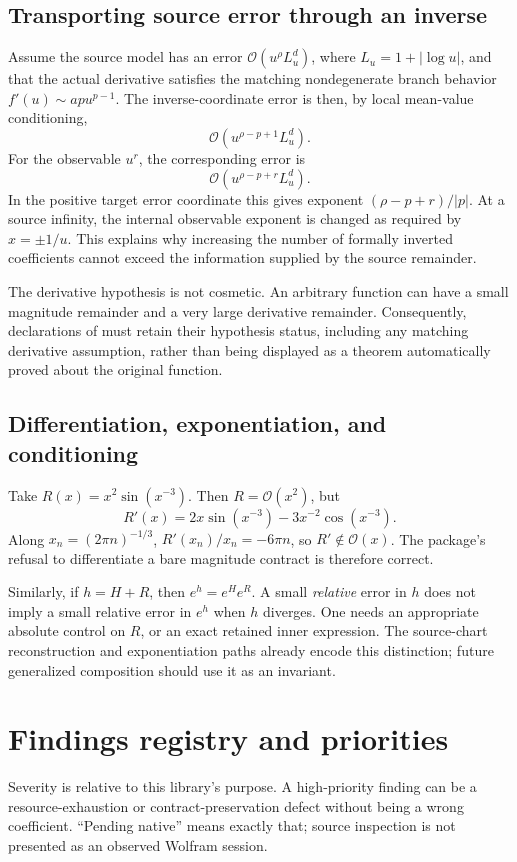 \documentclass[11pt,a4paper]{article}
\newcommand{\code}[1]{\texttt{\detokenize{#1}}}
\newcommand{\OO}{\mathcal O}
\begin{document}
\subsection{Transporting source error through an inverse}
Assume the source model has an error $\OO(u^\rho L_u^d)$, where
$L_u=1+|\log u|$, and that the actual derivative satisfies the matching
nondegenerate branch behavior $f'(u)\sim apu^{p-1}$. The inverse-coordinate
error is then, by local mean-value conditioning,
\[
 \OO(u^{\rho-p+1}L_u^d).
\]
For the observable $u^r$, the corresponding error is
\begin{equation}
 \OO(u^{\rho-p+r}L_u^d).
 \label{eq:inverseerror}
\end{equation}
In the positive target error coordinate this gives exponent
$(\rho-p+r)/|p|$. At a source infinity, the internal observable exponent is
changed as required by $x=\pm1/u$. This explains why increasing the number
of formally inverted coefficients cannot exceed the information supplied
by the source remainder.\cite{core,fourier,refinement}

The derivative hypothesis is not cosmetic. An arbitrary function can have
a small magnitude remainder and a very large derivative remainder.
Consequently, declarations of \code{"InputRemainder"} must retain their
hypothesis status, including any matching derivative assumption, rather
than being displayed as a theorem automatically proved about the original
function.

\subsection{Differentiation, exponentiation, and conditioning}
Take $R(x)=x^2\sin(x^{-3})$. Then $R=\OO(x^2)$, but
\[
 R'(x)=2x\sin(x^{-3})-3x^{-2}\cos(x^{-3}).
\]
Along $x_n=(2\pi n)^{-1/3}$, $R'(x_n)/x_n=-6\pi n$, so
$R'\notin\OO(x)$. The package's refusal to differentiate a bare magnitude
contract is therefore correct.\cite{seriesops}

Similarly, if $h=H+R$, then $e^h=e^H e^R$. A small \emph{relative} error in
$h$ does not imply a small relative error in $e^h$ when $h$ diverges. One
needs an appropriate absolute control on $R$, or an exact retained inner
expression. The source-chart reconstruction and exponentiation paths
already encode this distinction; future generalized composition should use
it as an invariant.\cite{seriesops,sourcecoords}

\section{Findings registry and priorities}
\label{sec:registry}
Severity is relative to this library's purpose. A high-priority finding can
be a resource-exhaustion or contract-preservation defect without being a
wrong coefficient. ``Pending native'' means exactly that; source inspection
is not presented as an observed Wolfram session.
\end{document}

